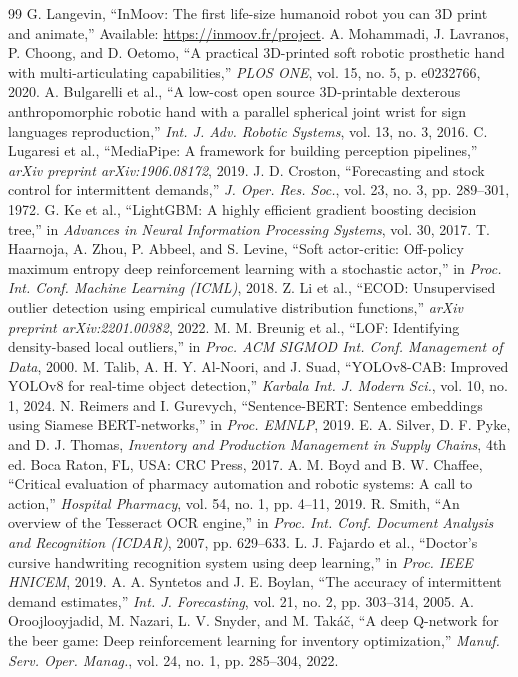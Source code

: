\documentclass[conference]{IEEEtran}
\begin{document}
\begin{thebibliography}{99}
 G. Langevin, ``InMoov: The first life-size humanoid robot you can 3D print and animate,'' Available: \url{https://inmoov.fr/project}.
 A. Mohammadi, J. Lavranos, P. Choong, and D. Oetomo, ``A practical 3D-printed soft robotic prosthetic hand with multi-articulating capabilities,'' \emph{PLOS ONE}, vol. 15, no. 5, p. e0232766, 2020.
 A. Bulgarelli et al., ``A low-cost open source 3D-printable dexterous anthropomorphic robotic hand with a parallel spherical joint wrist for sign languages reproduction,'' \emph{Int. J. Adv. Robotic Systems}, vol. 13, no. 3, 2016.
 C. Lugaresi et al., ``MediaPipe: A framework for building perception pipelines,'' \emph{arXiv preprint arXiv:1906.08172}, 2019.
 J. D. Croston, ``Forecasting and stock control for intermittent demands,'' \emph{J. Oper. Res. Soc.}, vol. 23, no. 3, pp. 289--301, 1972.
 G. Ke et al., ``LightGBM: A highly efficient gradient boosting decision tree,'' in \emph{Advances in Neural Information Processing Systems}, vol. 30, 2017.
 T. Haarnoja, A. Zhou, P. Abbeel, and S. Levine, ``Soft actor-critic: Off-policy maximum entropy deep reinforcement learning with a stochastic actor,'' in \emph{Proc. Int. Conf. Machine Learning (ICML)}, 2018.
 Z. Li et al., ``ECOD: Unsupervised outlier detection using empirical cumulative distribution functions,'' \emph{arXiv preprint arXiv:2201.00382}, 2022.
 M. M. Breunig et al., ``LOF: Identifying density-based local outliers,'' in \emph{Proc. ACM SIGMOD Int. Conf. Management of Data}, 2000.
 M. Talib, A. H. Y. Al-Noori, and J. Suad, ``YOLOv8-CAB: Improved YOLOv8 for real-time object detection,'' \emph{Karbala Int. J. Modern Sci.}, vol. 10, no. 1, 2024.
 N. Reimers and I. Gurevych, ``Sentence-BERT: Sentence embeddings using Siamese BERT-networks,'' in \emph{Proc. EMNLP}, 2019.
 E. A. Silver, D. F. Pyke, and D. J. Thomas, \emph{Inventory and Production Management in Supply Chains}, 4th ed. Boca Raton, FL, USA: CRC Press, 2017.
 A. M. Boyd and B. W. Chaffee, ``Critical evaluation of pharmacy automation and robotic systems: A call to action,'' \emph{Hospital Pharmacy}, vol. 54, no. 1, pp. 4--11, 2019.
 R. Smith, ``An overview of the Tesseract OCR engine,'' in \emph{Proc. Int. Conf. Document Analysis and Recognition (ICDAR)}, 2007, pp. 629--633.
 L. J. Fajardo et al., ``Doctor's cursive handwriting recognition system using deep learning,'' in \emph{Proc. IEEE HNICEM}, 2019.
 A. A. Syntetos and J. E. Boylan, ``The accuracy of intermittent demand estimates,'' \emph{Int. J. Forecasting}, vol. 21, no. 2, pp. 303--314, 2005.
 A. Oroojlooyjadid, M. Nazari, L. V. Snyder, and M. Tak\'a\v{c}, ``A deep Q-network for the beer game: Deep reinforcement learning for inventory optimization,'' \emph{Manuf. Serv. Oper. Manag.}, vol. 24, no. 1, pp. 285--304, 2022.
\end{thebibliography}
\end{document}
